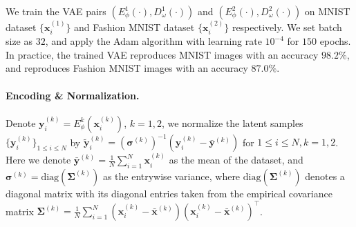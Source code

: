 \documentclass{article} %
\theoremstyle{plain}
\theoremstyle{definition}
\theoremstyle{remark}
\begin{document}
We train the VAE pairs $(E^1_\phi(\cdot), D^1_\omega(\cdot))$ and $(E^2_\phi(\cdot), D^2_\omega(\cdot))$ on MNIST dataset $\{\textbf{x}_i^{(1)}\}$ and Fashion MNIST dataset $\{\textbf{x}_i^{(2)}\}$ respectively. We set batch size as $32$, and apply the Adam algorithm \citep{adam2014method} with learning rate $10^{-4}$ for $150$ epochs. In practice, the trained VAE reproduces MNIST images with an accuracy $98.2\%$, and reproduces Fashion MNIST images with an accuracy $87.0\%.$ 

\paragraph{Encoding \& Normalization.} Denote $\textbf{y}_i^{(k)} = E^k_\phi(\textbf{x}_i^{(k)})$, $k=1,2$, we normalize the latent samples $\{\textbf{y}_i^{(k)}\}_{1\leq i\leq N}$ by $\widetilde{\textbf{y}}_i^{(k)} = (\boldsymbol{\sigma}^{(k)})^{-1}(\textbf{y}_i^{(k)} - \bar{\textbf{y}}^{(k)})$ for $1\leq i \leq N, k=1,2$. Here we denote $\bar{\textbf{y}}^{(k)} = \frac{1}{N}\sum_{i=1}^N \textbf{x}_i^{(k)}$ as the mean of the dataset, and $\boldsymbol{\sigma}^{(k)}=\mathrm{diag}(\boldsymbol{\Sigma}^{(k)})$ as the entrywise variance, where $\mathrm{diag}(\boldsymbol{\Sigma}^{(k)})$ denotes a diagonal matrix with its diagonal entries taken from the empirical covariance matrix $\boldsymbol{\Sigma}^{(k)} = \frac{1}{N}\sum_{i=1}^N (\textbf{x}_i^{(k)} - \bar{\textbf{x}}^{(k)})(\textbf{x}_i^{(k)} - \bar{\textbf{x}}^{(k)})^\top$. 
\end{document}
